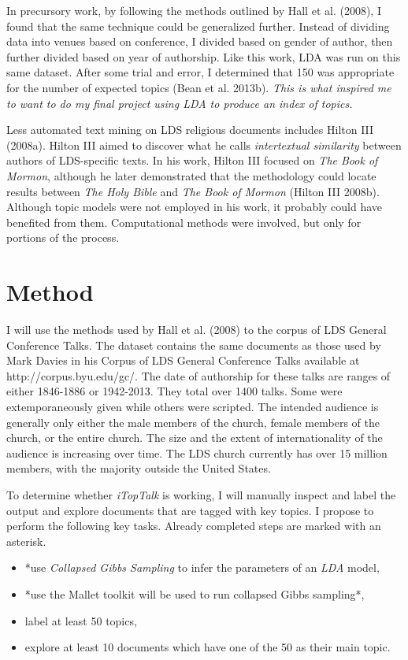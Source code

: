 In precursory work, by following the methods outlined by Hall et al. (2008), I found that the same technique could be generalized further. Instead of dividing data into venues based on conference, I divided based on gender of author, then further divided based on year of authorship. Like this work, LDA was run on this same dataset. After some trial and error, I determined that 150 was appropriate for the number of expected topics (Bean et al. 2013b). \textit{This is what inspired me to want to do my final project using \emph{LDA} to produce an index of topics.}

Less automated text mining on LDS religious documents includes Hilton III (2008a).  %
Hilton III aimed to discover what he calls \emph{intertextual similarity} between authors of LDS-specific texts. In his work, Hilton III focused on \emph{The Book of Mormon}, although he later demonstrated that the methodology could locate results between \emph{The Holy Bible} and \emph{The Book of Mormon} %
(Hilton III 2008b). Although topic models were not employed in his work, it probably could have benefited from them. Computational methods were involved, but only for portions of the process.


\section{Method}
I will use the methods used by Hall et al. (2008)
to the corpus of LDS General Conference Talks. The dataset contains the same documents as those used by Mark Davies in his Corpus of LDS General Conference Talks available at http://corpus.byu.edu/gc/. The date of authorship for these talks are ranges of either 1846-1886 or 1942-2013. They total over 1400 talks. Some were extemporaneously given while others were scripted. The intended audience is generally only either the male members of the church, female members of the church, or the entire church. The size and the extent of internationality of the audience is increasing over time. The LDS church currently has over 15 million members, with the majority outside the United States.

To determine whether \emph{iTopTalk} is working, I will manually inspect and label the output and explore documents that are tagged with key topics. I propose to perform the following key tasks. Already completed steps are marked with an asterisk.
\begin{itemize}
  \item *use \emph{Collapsed Gibbs Sampling} to infer the parameters of an \emph{LDA} model,
  \item *use the Mallet toolkit will be used to run collapsed Gibbs sampling*,
  \item label at least 50 topics,
  \item explore at least 10 documents which have one of the 50 as their main topic.
\end{itemize}


